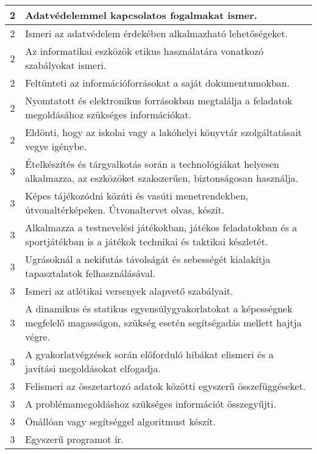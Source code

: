 \begin{longtable}{c | p{12cm} }
                                          2 &  Adatvédelemmel kapcsolatos fogalmakat ismer. \\ \hline
                                          2 &  Ismeri az adatvédelem érdekében alkalmazható lehetőségeket. \\ \hline
                                          2 &  Az informatikai eszközök etikus használatára vonatkozó szabályokat ismeri. \\ \hline
                                          2 &  Feltünteti az információforrásokat a saját dokumentumokban. \\ \hline
                                          2 &  Nyomtatott és elektronikus forrásokban megtalálja a feladatok megoldásához szükséges információkat. \\ \hline
                                          2 &  Eldönti, hogy az iskolai vagy a lakóhelyi könyvtár szolgáltatásait vegye igénybe. \\ \hline
                                      
                                
                                          3 &  Ételkészítés és tárgyalkotás során a technológiákat helyesen alkalmazza, az eszközöket szakszerűen, biztonságosan használja. \\ \hline
                                          3 &  Képes tájékozódni közúti és vasúti menetrendekben, útvonaltérképeken. Útvonaltervet olvas, készít. \\ \hline
                                          3 &  Alkalmazza a testnevelési játékokban, játékos feladatokban és a sportjátékban is a játékok technikai és taktikai készletét. \\ \hline
                                          3 &  Ugrásoknál a nekifutás távolságát és sebességét kialakítja tapasztalatok felhasználásával. \\ \hline
                                          3 &  Ismeri az atlétikai versenyek alapvető szabályait. \\ \hline
                                          3 &  A dinamikus és statikus egyensúlygyakorlatokat a képességnek megfelelő magasságon, szükség esetén segítségadás mellett hajtja végre. \\ \hline
                                          3 &  A gyakorlatvégzések során előforduló hibákat elismeri és a javítási megoldásokat elfogadja. \\ \hline
                                          3 &  Felismeri az összetartozó adatok közötti egyszerű összefüggéseket. \\ \hline
                                          3 &  A problémamegoldáshoz szükséges információt összegyűjti. \\ \hline
                                          3 &  Önállóan vagy segítséggel algoritmust készít. \\ \hline
                                          3 &  Egyszerű programot ír. \\ \hline
                                      

\end{longtable}
